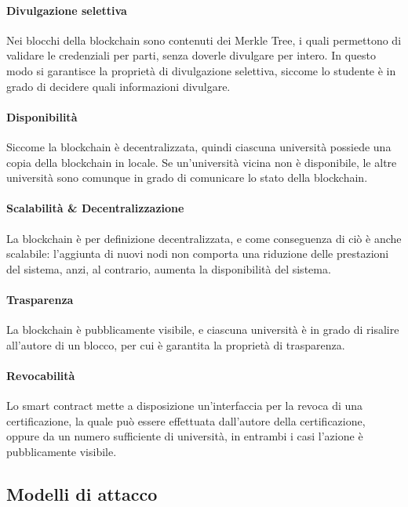 \documentclass[a4paper,12pt]{article}
\begin{document}
\paragraph{Divulgazione selettiva}
Nei blocchi della blockchain sono contenuti dei Merkle Tree, i quali permettono di validare le credenziali per parti, senza doverle divulgare per intero. In questo modo si garantisce la proprietà di divulgazione selettiva, siccome lo studente è in grado di decidere quali informazioni divulgare.
\paragraph{Disponibilità }
Siccome la blockchain è decentralizzata, quindi ciascuna università possiede una copia della blockchain in locale. Se un'università vicina non è disponibile, le altre università sono comunque in grado di comunicare lo stato della blockchain.
\paragraph{Scalabilità \& Decentralizzazione}
La blockchain è per definizione decentralizzata, e come conseguenza di ciò è anche scalabile: l'aggiunta di nuovi nodi non comporta una riduzione delle prestazioni del sistema, anzi, al contrario, aumenta la disponibilità del sistema. 
\paragraph{Trasparenza}
La blockchain è pubblicamente visibile, e ciascuna università è in grado di risalire all'autore di un blocco, per cui è garantita la proprietà di trasparenza.
\paragraph{Revocabilità}
Lo smart contract mette a disposizione un'interfaccia per la revoca di una certificazione, la quale può essere effettuata dall'autore della certificazione, oppure da un numero sufficiente di università, in entrambi i casi l'azione è pubblicamente visibile.
\subsection{Modelli di attacco}
\end{document}
